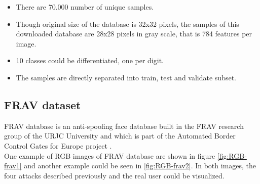 \begin{itemize}
 \item There are 70.000 number of unique samples.
 \item Though original size of the database is 32x32 pixels, the samples of this downloaded database are 28x28 pixels in gray scale, that is 784 features per image.
 \item 10 classes could be differentiated, one per digit.
\item The samples are directly separated into train, test and validate subset.
\end{itemize}

\subsection{FRAV dataset}
FRAV database is an anti-spoofing face database built in the FRAV research group of the URJC University and which is part of the Automated Border Control Gates for Europe project \cite{ABC4EU}.\\

One example of RGB images of FRAV database are shown in figure \ref{fig:RGB-frav1} and another example could be seen in \ref{fig:RGB-frav2}. In both images, the four attacks described previously and the real user could be visualized. \\

